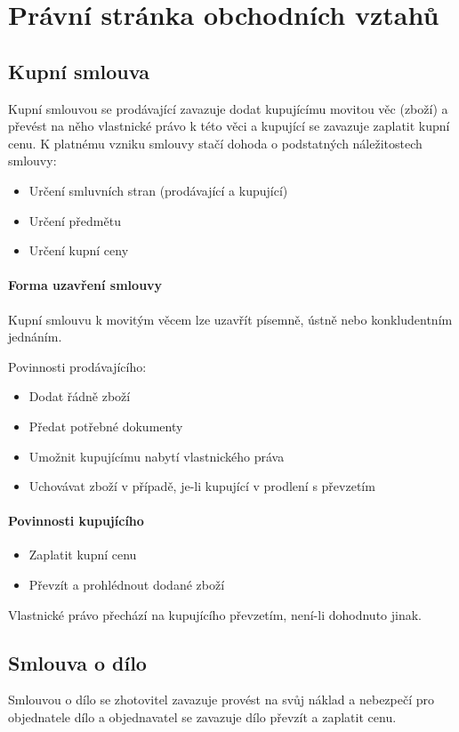 \documentclass[11pt,a4paper,twoside]{book}
\begin{document}
	\section*{Právní stránka obchodních vztahů}
	\subsection*{Kupní smlouva}
	Kupní smlouvou se prodávající zavazuje dodat kupujícímu movitou věc (zboží) a převést na něho vlastnické právo k této věci a kupující se zavazuje zaplatit kupní cenu. K platnému vzniku smlouvy stačí dohoda o podstatných náležitostech smlouvy:
	\begin{itemize}
		\item Určení smluvních stran (prodávající a kupující)
		\item Určení předmětu
		\item Určení kupní ceny
	\end{itemize}

	\paragraph*{Forma uzavření smlouvy}
	Kupní smlouvu k movitým věcem lze uzavřít písemně, ústně nebo konkludentním jednáním.
	
	Povinnosti prodávajícího:
	\begin{itemize}
		\item Dodat řádně zboží
		\item Předat potřebné dokumenty
		\item Umožnit kupujícímu nabytí vlastnického práva
		\item Uchovávat zboží v případě, je-li kupující v prodlení s převzetím	
	\end{itemize}

	\paragraph*{Povinnosti kupujícího}
	\begin{itemize}
		\item Zaplatit kupní cenu
		\item Převzít a prohlédnout dodané zboží
	\end{itemize}
	Vlastnické právo přechází na kupujícího převzetím, není-li dohodnuto jinak.

	\subsection*{Smlouva o dílo}
	Smlouvou o dílo se zhotovitel zavazuje provést na svůj náklad a nebezpečí pro objednatele dílo a objednavatel se zavazuje dílo převzít a zaplatit cenu.
\end{document}
